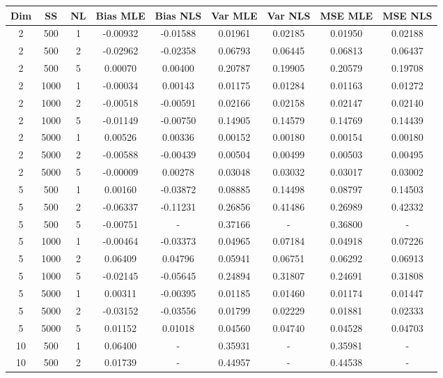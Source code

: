 \documentclass{article}
\begin{document}
\begin{figure}[H]
  \begin{table}[H]
    \centering
  \begin{tabular}{|ccc|cccccc|}
    \hline
      Dim & SS & NL & Bias MLE & Bias NLS & Var MLE & Var NLS & MSE MLE & MSE NLS \\
      \hline
      2 & 500 & 1 & -0.00932 & -0.01588 & 0.01961 & 0.02185 & 0.01950 & 0.02188 \\
      2 & 500 & 2 & -0.02962 & -0.02358 & 0.06793 & 0.06445 & 0.06813 & 0.06437 \\
      2 & 500 & 5 & 0.00070 & 0.00400 & 0.20787 & 0.19905 & 0.20579 & 0.19708 \\
      2 & 1000 & 1 & -0.00034 & 0.00143 & 0.01175 & 0.01284 & 0.01163 & 0.01272 \\
      2 & 1000 & 2 & -0.00518 & -0.00591 & 0.02166 & 0.02158 & 0.02147 & 0.02140 \\
      2 & 1000 & 5 & -0.01149 & -0.00750 & 0.14905 & 0.14579 & 0.14769 & 0.14439 \\
      2 & 5000 & 1 & 0.00526 & 0.00336 & 0.00152 & 0.00180 & 0.00154 & 0.00180 \\
      2 & 5000 & 2 & -0.00588 & -0.00439 & 0.00504 & 0.00499 & 0.00503 & 0.00495 \\
      2 & 5000 & 5 & -0.00009 & 0.00278 & 0.03048 & 0.03032 & 0.03017 & 0.03002 \\
      5 & 500 & 1 & 0.00160 & -0.03872 & 0.08885 & 0.14498 & 0.08797 & 0.14503 \\
      5 & 500 & 2 & -0.06337 & -0.11231 & 0.26856 & 0.41486 & 0.26989 & 0.42332 \\
      5 & 500 & 5 & -0.00751 & - & 0.37166 & - & 0.36800 & - \\
      5 & 1000 & 1 & -0.00464 & -0.03373 & 0.04965 & 0.07184 & 0.04918 & 0.07226 \\
      5 & 1000 & 2 & 0.06409 & 0.04796 & 0.05941 & 0.06751 & 0.06292 & 0.06913 \\
      5 & 1000 & 5 & -0.02145 & -0.05645 & 0.24894 & 0.31807 & 0.24691 & 0.31808 \\
      5 & 5000 & 1 & 0.00311 & -0.00395 & 0.01185 & 0.01460 & 0.01174 & 0.01447 \\
      5 & 5000 & 2 & -0.03152 & -0.03556 & 0.01799 & 0.02229 & 0.01881 & 0.02333 \\
      5 & 5000 & 5 & 0.01152 & 0.01018 & 0.04560 & 0.04740 & 0.04528 & 0.04703 \\
      10 & 500 & 1 & 0.06400 & - & 0.35931 & - & 0.35981 & - \\
      10 & 500 & 2 & 0.01739 & - & 0.44957 & - & 0.44538 & - \\

\end{tabular}
\end{table}
\end{figure}
\end{document}
